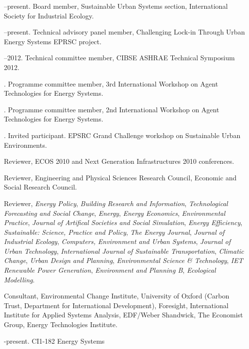 \documentclass[11pt,a4paper]{article}
\begin{document}
\bigskip 

\noindent{}%
%
--present. Board member, Sustainable Urban Systems section, International Society for Industrial Ecology.

--present. Technical advisory panel member, Challenging Lock-in Through Urban Energy Systems EPRSC project.

--2012. Technical committee member, CIBSE ASHRAE Technical Symposium 2012.

. Programme committee member, 3rd International Workshop on Agent Technologies for Energy Systems.

. Programme committee member, 2nd International Workshop on Agent Technologies for Energy Systems.

. Invited participant.  EPSRC Grand Challenge workshop on Sustainable Urban Environments.

\ind Reviewer, ECOS 2010 and Next Generation Infrastructures 2010 conferences.

\ind Reviewer, Engineering and Physical Sciences Research Council, Economic and Social Research Council.

\ind Reviewer, \emph{Energy Policy}, \emph{Building Research and Information}, \emph{Technological Forecasting and Social Change}, \emph{Energy}, \emph{Energy Economics}, \emph{Environmental Practice}, \emph{Journal of Artifical Societies and Social Simulation}, \emph{Energy Efficiency}, \emph{Sustainable: Science, Practice and Policy}, \emph{The Energy Journal}, \emph{Journal of Industrial Ecology}, \emph{Computers, Environment and Urban Systems}, \emph{Journal of Urban Technology}, \emph{International Journal of Sustainable Transportation}, \emph{Climatic Change}, \emph{Urban Design and Planning}, \emph{Environmental Science \& Technology}, \emph{IET Renewable Power Generation}, \emph{Environment and Planning B}, \emph{Ecological Modelling}.

\ind Consultant, Environmental Change Institute, University of Oxford (Carbon Trust, Department for International Development), Foresight, International Institute for Applied Systems Analysis, EDF/Weber Shandwick, The Economist Group, Energy Technologies Institute.
\bigskip%

\noindent{}%
%
-present.  CI{1-182} Energy Systems
\end{document}
